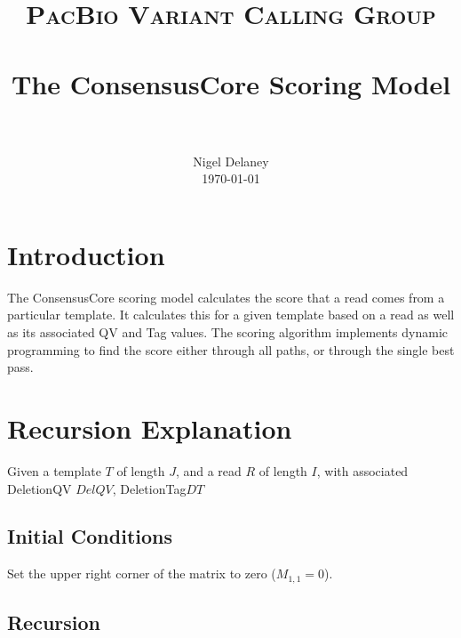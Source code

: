 \documentclass[paper=a4, fontsize=11pt]{scrartcl}
\title{
		\usefont{OT1}{bch}{b}{n}
		\normalfont \normalsize \textsc{PacBio Variant Calling Group} \\ [25pt]
		\horrule{0.5pt} \\[0.4cm]
		\huge The ConsensusCore Scoring Model \\
		\horrule{2pt} \\[0.5cm]
}
\author{
		\normalfont 								\normalsize
        Nigel Delaney\\[-3pt]		\normalsize
        \today
}
\date{}
\numberwithin{equation}{section}		%
\numberwithin{figure}{section}			%
\numberwithin{table}{section}				%
\begin{document}
\maketitle
\section{Introduction}

The ConsensusCore scoring model calculates the score that a read comes from a particular template.  It calculates this for a given template based on a read as well as its associated QV and Tag values.  The scoring algorithm implements dynamic programming to find the score either through all paths, or through the single best pass.

  

\section{ Recursion Explanation} 

Given a template \( T \) of length \(J\), and a read \(R\) of length \(I\), with associated DeletionQV \(DelQV\), DeletionTag\(DT\)

\subsection*{Initial Conditions}

Set the upper right corner of the matrix to zero (\(M_{1,1} = 0 \)).

\subsection*{Recursion}
\end{document}
